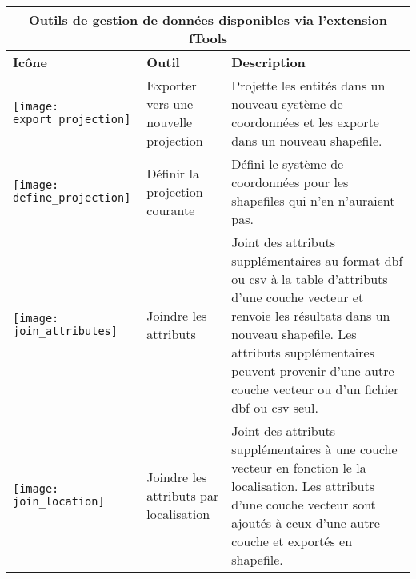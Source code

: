 \begin{table}[ht]
\centering
\begin{tabular}{|m{1cm}|m{3cm}|m{9cm}|}
 \hline \multicolumn{3}{|c|}{\textbf{Outils de gestion de données disponibles via l'extension fTools}} \\
 \hline \textbf{Icône} & \textbf{Outil} & \textbf{Description} \\
 \hline \texttt{[image: export\_projection]} & Exporter vers une nouvelle projection & Projette les entités dans un nouveau système de coordonnées et les exporte dans un nouveau shapefile. \\
 \hline \texttt{[image: define\_projection]} & Définir la projection courante & Défini le système de coordonnées pour les shapefiles qui n'en n'auraient pas. \\
 \hline \texttt{[image: join\_attributes]} & Joindre les attributs & Joint des attributs supplémentaires au format dbf ou csv à la table d'attributs d'une couche vecteur et renvoie les résultats dans un nouveau shapefile. Les attributs supplémentaires peuvent provenir d'une autre couche vecteur ou d'un fichier dbf ou csv seul. \\
 \hline \texttt{[image: join\_location]} & Joindre les attributs par localisation & Joint des attributs supplémentaires à une couche vecteur en fonction le la localisation. Les attributs d'une couche vecteur sont ajoutés à ceux d'une autre couche et exportés en shapefile. \\

\end{tabular}
\end{table}
